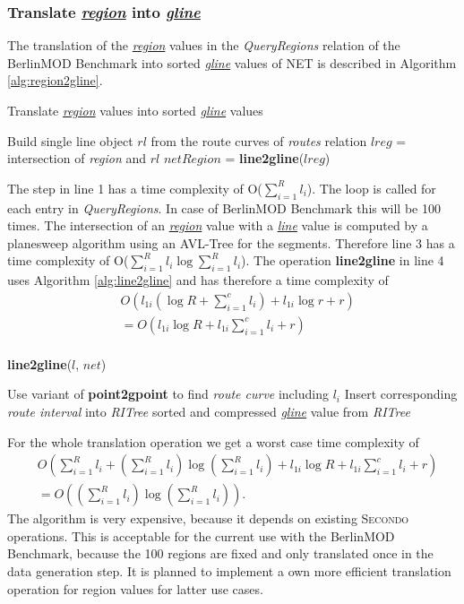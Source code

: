 \documentclass[a4paper]{article}
\newcommand{\secondo}{\textsc{Secondo}}
\newcommand{\bmodb} {BerlinMOD Benchmark}
\newcommand{\op}[1]{\textbf{#1}}
\newcommand{\dt}[1]{\textsl{\underline{#1}}}
\begin{document}
\subsubsection{Translate \dt{region} into \dt{gline}}
The translation of the \dt{region} values in the \textit{QueryRegions} relation of the
\bmodb{} into sorted \dt{gline} values of NET is described in Algorithm
\ref{alg:region2gline}.
\begin{algorithm}[H]
  \caption{Translate \dt{region} values into sorted \dt{gline} values}
  \label{alg:region2gline}
  \begin{algorithmic}[1]
     \STATE Build single line object $rl$ from the route curves of \textit{routes}
relation
        \STATE $lreg$ = intersection of \textit{region} and $rl$
        \STATE $netRegion$ = \op{line2gline}($lreg$)
     \ENDFOR
  \end{algorithmic}
\end{algorithm}
The step in line 1 has a time complexity of O($\sum_{i=1}^{R}{l_i}$). The loop
is
called for each entry in \textit{QueryRegions}. In case of \bmodb{} this will be 100
times.
The intersection of an \dt{region} value with a \dt{line} value is computed by
a planesweep algorithm using an AVL-Tree for the segments. Therefore line 3 has
a time
complexity of O($\sum_{i=1}^{R}{l_i} \log \sum_{i=1}^{R}{l_i}$). The operation
\op{line2gline} in line 4 uses Algorithm \ref{alg:line2gline} and has therefore
a time complexity of
\begin{align*}
&O(l_{1i} (\log R + \sum_{i=1}^{c}{l_i}) + l_{1i} \log r + r)\\
&= O(l_{1i}\log R + l_{1i}\sum_{i=1}^{c}{l_i} + r)\\
\end{align*}
\begin{algorithm}[H]
  \caption{\op{line2gline}($l$, $net$)}
  \label{alg:line2gline}
  \begin{algorithmic}[1]
      \STATE Use variant of \op{point2gpoint} to find \textit{route curve} including
$l_i$
      \STATE Insert corresponding \textit{route interval} into \textit{RITree}
    \ENDFOR
    \RETURN sorted and compressed \dt{gline} value from \textit{RITree}
  \end{algorithmic}
\end{algorithm}
For the whole translation operation we get a worst case time complexity of
\begin{align*}
& O(\sum_{i=1}^{R}{l_i} + (\sum_{i=1}^{R}l_i) \log (\sum_{i=1}^{R}{l_i}) +
 l_{1i}\log R + l_{1i}\sum_{i=1}^{c}{l_i} + r)\\
& = O((\sum_{i=1}^{R}{l_i}) \log (\sum_{i=1}^{R}{l_i})).
\end{align*}
The algorithm is very expensive, because it depends on existing \secondo{}
operations.
This is acceptable for the current use with the \bmodb{},
because the 100 regions are fixed and only translated once in the data
generation
step. It is planned to implement a own more efficient translation operation for
region values for latter use cases.
\end{document}
